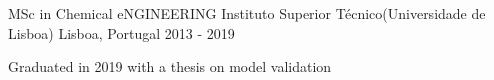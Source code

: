 

\begin{cventries}

  \cventry
    {MSc in Chemical eNGINEERING} %
    {Instituto Superior Técnico(Universidade de Lisboa)} %
    {Lisboa, Portugal} %
    {2013 - 2019} %
    {
      \begin{cvitems} %
        \item {Graduated in 2019 with a thesis on model validation}
      \end{cvitems}
    }

\end{cventries}
